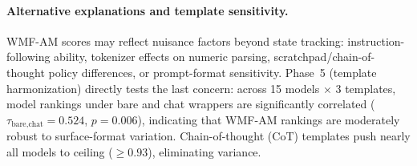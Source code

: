 \documentclass{article}
\begin{document}
\paragraph{Alternative explanations and template sensitivity.}
WMF-AM scores may reflect nuisance factors beyond state tracking:
instruction-following ability, tokenizer effects on numeric parsing,
scratchpad/chain-of-thought policy differences, or prompt-format
sensitivity. Phase~5 (template harmonization) directly tests the last
concern: across 15 models $\times$ 3 templates, model rankings under
bare and chat wrappers are significantly correlated
($\tau_{\text{bare,chat}} = 0.524$, $p = 0.006$), indicating that
WMF-AM rankings are moderately robust to surface-format variation.
Chain-of-thought (CoT) templates push nearly all models to ceiling
($\geq 0.93$), eliminating variance.
\end{document}
